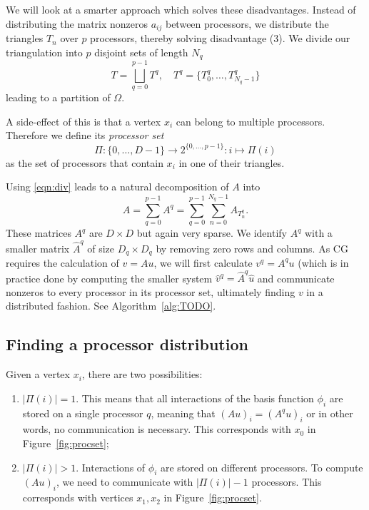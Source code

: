 \documentclass[11pt]{amsart}
\theoremstyle{definition}
\begin{document}
We will look at a smarter approach which solves these disadvantages. Instead of distributing the matrix nonzeros $a_{ij}$ between processors, we distribute the triangles $T_n$ over $p$ processors, thereby solving disadvantage (3). We divide our triangulation into $p$ disjoint sets of length $N_q$
\[
  T = \bigsqcup_{q=0}^{p-1} T^q, \quad T^q = \{ T^q_0, \ldots, T^q_{N_q-1} \}
\]
leading to a partition of $\Omega$.

A side-effect of this is that a vertex $x_i$ can belong to multiple processors. Therefore we define its \emph{processor set} 
\[
  \Pi: \{0, \ldots, D-1\} \to 2^{\{0, \ldots, p-1\}}: i \mapsto \Pi(i)
\]
as the set of processors that contain $x_i$ in one of their triangles.

Using \eqref{eqn:div} leads to a natural decomposition of $A$ into
\[
  A = \sum_{q=0}^{p-1} A^q = \sum_{q=0}^{p-1} \sum_{n=0}^{N_q-1} A_{T^q_n}.
\]
These matrices $A^q$ are $D \times D$ but again very sparse. We identify $A^q$ with a smaller matrix $\hat A^q$ of size $D_q \times D_q$ by removing zero rows and columns. As CG requires the calculation of $v = Au$, we will first calculate $v^q = A^q u$ (which is in practice done by computing the smaller system $\hat v^q = \hat A^q \hat u$ and communicate nonzeros to every processor in its processor set, ultimately finding $v$ in a distributed fashion. See Algorithm~\ref{alg:TODO}.

\subsection{Finding a processor distribution}
Given a vertex $x_i$, there are two possibilities:
\begin{enumerate}
  \item $|\Pi(i)| = 1$. This means that all interactions of the basis function $\phi_i$ are stored on a single processor $q$, meaning that $(Au)_i = (A^qu)_i$ or in other words, no communication is necessary. This corresponds with $x_0$ in Figure~\ref{fig:procset};
  \item $|\Pi(i)| > 1$. Interactions of $\phi_i$ are stored on different processors. To compute $(Au)_i$, we need to communicate with $|\Pi(i)|-1$ processors. This corresponds with vertices $x_1, x_2$ in Figure~\ref{fig:procset}.
\end{enumerate}
\end{document}
